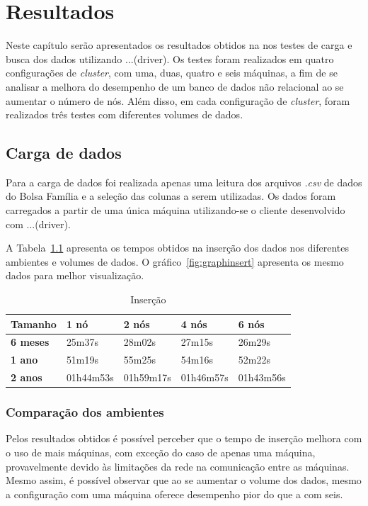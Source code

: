 \chapter{Resultados}

Neste capítulo serão apresentados os resultados obtidos na nos testes de carga e busca dos dados utilizando ...(driver). Os testes foram realizados em quatro configurações de \emph{cluster}, com uma, duas, quatro e seis máquinas, a fim de se analisar a melhora do desempenho de um banco de dados não relacional ao se aumentar o número de nós. Além disso, em cada configuração de \emph{cluster}, foram realizados três testes com diferentes volumes de dados.

\section{Carga de dados}
Para a carga de dados foi realizada apenas uma leitura dos arquivos \emph{.csv} de dados do Bolsa Família e a seleção das colunas a serem utilizadas. Os dados foram carregados a partir de uma única máquina utilizando-se o cliente desenvolvido com ...(driver).

A Tabela~\ref{tb_insert} apresenta os tempos obtidos na inserção dos dados nos diferentes ambientes e volumes de dados. O gráfico~\ref{fig:graphinsert} apresenta os mesmo dados para melhor visualização.

\begin{table}[]
	\centering
	\caption{Inserção}
	\label{tb_insert}
	\begin{tabular}{lllll}
		\textbf{Tamanho}	& \textbf{1 nó} & \textbf{2 nós} & \textbf{4 nós} & \textbf{6 nós} \\ \hline
		\textbf{6 meses}    & 25m37s        & 28m02s         & 27m15s         & 26m29s         \\ \hline
		\textbf{1 ano}      & 51m19s        & 55m25s         & 54m16s         & 52m22s         \\ \hline
		\textbf{2 anos}     & 01h44m53s     & 01h59m17s      & 01h46m57s      & 01h43m56s      \\ \hline
	\end{tabular}
\end{table}

\subsection{Comparação dos ambientes}

Pelos resultados obtidos é possível perceber que o tempo de inserção melhora com o uso de mais máquinas, com exceção do caso de apenas uma máquina, provavelmente devido às limitações da rede na comunicação entre as máquinas. Mesmo assim, é possível observar que ao se aumentar o volume dos dados, mesmo a configuração com uma máquina oferece desempenho pior do que a com seis. 

